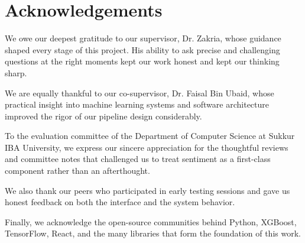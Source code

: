 \chapter*{Acknowledgements}
\label{acknowledgements}

We owe our deepest gratitude to our supervisor, Dr. Zakria, whose guidance shaped every stage of this project. His ability to ask precise and challenging questions at the right moments kept our work honest and kept our thinking sharp.

We are equally thankful to our co-supervisor, Dr. Faisal Bin Ubaid, whose practical insight into machine learning systems and software architecture improved the rigor of our pipeline design considerably.

To the evaluation committee of the Department of Computer Science at Sukkur IBA University, we express our sincere appreciation for the thoughtful reviews and committee notes that challenged us to treat sentiment as a first-class component rather than an afterthought.

We also thank our peers who participated in early testing sessions and gave us honest feedback on both the interface and the system behavior.

Finally, we acknowledge the open-source communities behind Python, XGBoost, TensorFlow, React, and the many libraries that form the foundation of this work.